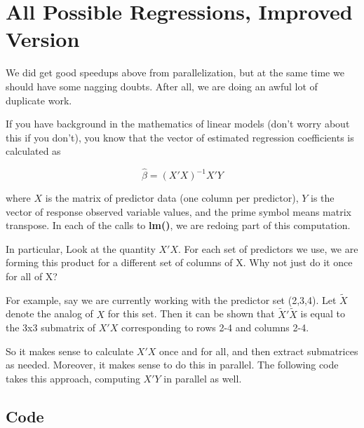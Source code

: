 \section{All Possible Regressions, Improved Version}
\label{improvedversion}

We did get good speedups above from parallelization, but at the same
time we should have some nagging doubts.  After all, we are doing an
awful lot of duplicate work.

If you have background in the mathematics of linear models (don't worry
about this if you don't), you know that the vector of estimated
regression coefficients is calculated as

\begin{equation}
\widehat{\beta} = (X'X)^{-1} X'Y
\end{equation}

where $X$ is the matrix of predictor data (one column per predictor), $Y$ is
the vector of response observed variable values, and the prime symbol
means matrix transpose.  In each of the calls to {\bf lm()}, we are
redoing part of this computation.

In particular, Look at the quantity $X'X$.  For each set of predictors
we use, we are forming this product for a different set of columns of X.
Why not just do it once for all of X?  

For example, say we are currently working with the predictor set
(2,3,4).  Let $\tilde{X}$ denote the analog of $X$ for this set.  Then
it can be shown that $\tilde{X}' \tilde{X}$ is equal to the 3x3
submatrix of $X'X$ corresponding to rows 2-4 and columns 2-4.

So it makes sense to calculate $X'X$ once and for all, and then extract
submatrices as needed.  Moreover, it makes sense to do this in parallel.
The following code takes this approach, computing $X'Y$ in parallel as
well.

\subsection{Code}

